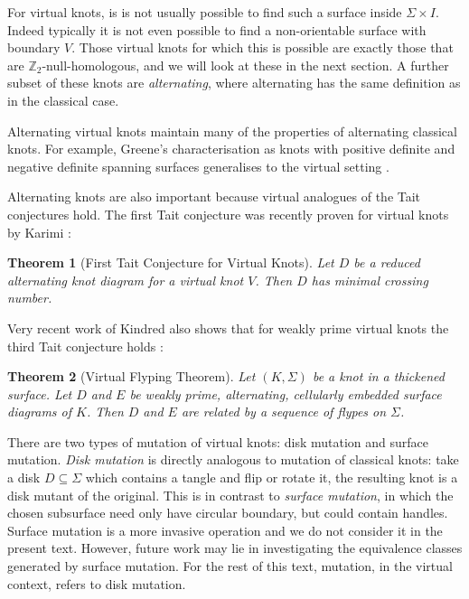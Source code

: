 \documentclass[12pt]{report}
\newcommand{\Z}{\mathbb{Z}}
\newtheorem*{theorem}{Theorem}
\theoremstyle{upright}
\begin{document}
For virtual knots, is is not usually possible to find such a surface inside $\Sigma \times I$. Indeed typically it is not even possible to find a non-orientable surface with boundary $V$. Those virtual knots for which this is possible are exactly those that are $\Z_{2}$-null-homologous, and we will look at these in the next section. A further subset of these knots are \textit{alternating}, where alternating has the same definition as in the classical case.

Alternating virtual knots maintain many of the properties of alternating classical knots. For example, Greene's characterisation as knots with positive definite and negative definite spanning surfaces generalises to the virtual setting \cite{alternating-links-thickened-surfaces}.

Alternating knots are also important because virtual analogues of the Tait conjectures hold. The first Tait conjecture was recently proven for virtual knots by Karimi \cite[Theorem 1.6]{alternating-virtual-knots}:

\begin{theorem}[First Tait Conjecture for Virtual Knots]
Let $D$ be a reduced alternating knot diagram for a virtual knot $V$. Then $D$ has minimal crossing number.
\end{theorem}

Very recent work of Kindred also shows that for weakly prime virtual knots the third Tait conjecture holds \cite[Theorem 4.18]{virtual-flyping-theorem}:

\begin{theorem}[Virtual Flyping Theorem]
Let $(K, \Sigma)$ be a knot in a thickened surface. Let $D$ and $E$ be weakly prime, alternating, cellularly embedded surface diagrams of $K$. Then $D$ and $E$ are related by a sequence of flypes on $\Sigma$.
\end{theorem}

There are two types of mutation of virtual knots: disk mutation and surface mutation. \textit{Disk mutation} is directly analogous to mutation of classical knots: take a disk $D \subseteq \Sigma$ which contains a tangle and flip or rotate it, the resulting knot is a disk mutant of the original. This is in contrast to \textit{surface mutation}, in which the chosen subsurface need only have circular boundary, but could contain handles. Surface mutation is a more invasive operation and we do not consider it in the present text. However, future work may lie in investigating the equivalence classes generated by surface mutation. For the rest of this text, mutation, in the virtual context, refers to disk mutation.
\end{document}
